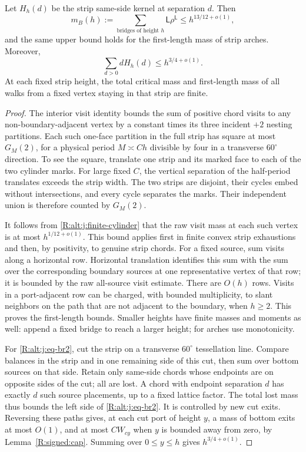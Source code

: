 \begin{lemma}
\label{R:signed:strip-moments}
Let $H_h(d)$ be the strip same-side kernel at separation $d$. Then
\[
 m_B(h):=\sum_{\text{bridges of height }h}\mathsf L\rho^{\mathsf L}
       \le h^{13/12+o(1)},
\]
and the same upper bound holds for the first-length mass of strip arches.
Moreover,
\begin{equation}\label{R:alt:j:eq-br2}
 \sum_{d>0}d H_h(d)\le h^{3/4+o(1)}.
\end{equation}
At each fixed strip height, the total critical mass and first-length mass
of all walks from a fixed vertex staying in that strip are finite.
\end{lemma}
\begin{proof}
The interior visit identity bounds the sum of positive chord visits to
any non-boundary-adjacent vertex by a constant times its three incident
$+2$ nesting partitions. Each such one-face partition in the full strip
has square at most $G_M(2)$, for a physical period $M\asymp Ch$ divisible
by four in a transverse $60^\circ$ direction. To see the square, translate
one strip and its marked face to each of the two cylinder marks. For
large fixed $C$, the vertical separation of the half-period translates
exceeds the strip width. The two strips are disjoint, their cycles embed
without intersections, and every cycle separates the marks. Their
independent union is therefore counted by $G_M(2)$.

It follows from \eqref{R:alt:j:finite-cylinder} that the raw visit mass
at each such vertex is at most $h^{1/12+o(1)}$. This bound applies first
in finite convex strip exhaustions and then, by positivity, to genuine
strip chords. For a fixed source, sum visits along a horizontal row.
Horizontal translation identifies this sum with the sum over the
corresponding boundary sources at one representative vertex of that row;
it is bounded by the raw all-source visit estimate. There are $O(h)$
rows. Visits in a port-adjacent row can be charged, with bounded
multiplicity, to slant neighbors on the path that are not adjacent to
the boundary, when $h\ge2$. This proves the first-length bounds. Smaller
heights have finite masses and moments as well: append a fixed bridge
to reach a larger height; for arches use monotonicity.

For \eqref{R:alt:j:eq-br2}, cut the strip on a transverse $60^\circ$
tessellation line. Compare balances in the strip and in one remaining
side of this cut, then sum over bottom sources on that side. Retain only
same-side chords whose endpoints are on opposite sides of the cut;
all are lost. A chord with endpoint separation $d$ has exactly $d$ such
source placements, up to a fixed lattice factor. The total lost mass thus bounds the left
side of \eqref{R:alt:j:eq-br2}. It is controlled by new cut exits.
Reversing these paths gives, at each cut port of height $y$, a mass of
bottom exits at most $O(1)$, and at most $CW_{cy}$ when $y$ is bounded
away from zero, by Lemma~\ref{R:signed:cap}. Summing over $0\le y\le h$
gives $h^{3/4+o(1)}$.


\end{proof}
